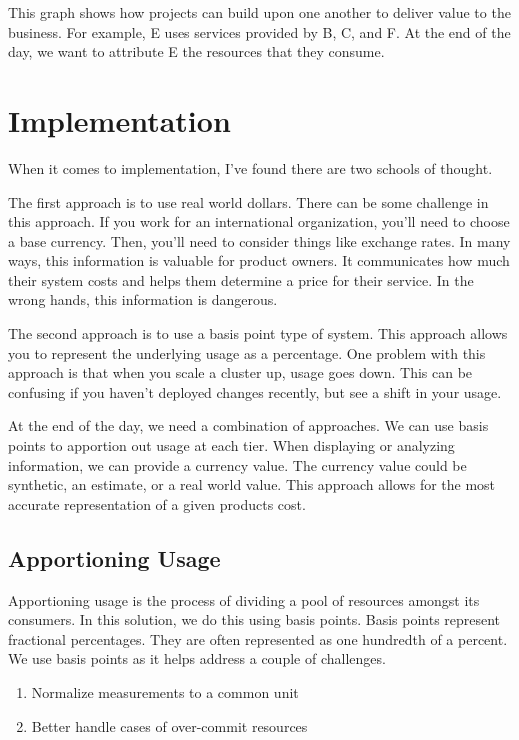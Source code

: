 \documentclass[10pt, a4paper, twocolumn]{article}
\begin{document}
    This graph shows how projects can build upon one another to deliver value to the business.
    For example, E uses services provided by B, C, and F.
    At the end of the day, we want to attribute E the resources that they consume.

\section*{Implementation}
  When it comes to implementation, I've found there are two schools of thought.

  The first approach is to use real world dollars.
  There can be some challenge in this approach.
  If you work for an international organization, you'll need to choose a base currency.
  Then, you'll need to consider things like exchange rates.
  In many ways, this information is valuable for product owners.
  It communicates how much their system costs and helps them determine a price for their service.
  In the wrong hands, this information is dangerous.

  The second approach is to use a basis point type of system.
  This approach allows you to represent the underlying usage as a percentage.
  One problem with this approach is that when you scale a cluster up, usage goes down.
  This can be confusing if you haven't deployed changes recently, but see a shift in your usage.

  At the end of the day, we need a combination of approaches.
  We can use basis points to apportion out usage at each tier.
  When displaying or analyzing information, we can provide a currency value.
  The currency value could be synthetic, an estimate, or a real world value.
  This approach allows for the most accurate representation of a given products cost.

  \subsection*{Apportioning Usage}
    Apportioning usage is the process of dividing a pool of resources amongst its consumers.
    In this solution, we do this using basis points.
    Basis points represent fractional percentages.
    They are often represented as one hundredth of a percent.
    We use basis points as it helps address a couple of challenges.

    \begin{enumerate}
      \item Normalize measurements to a common unit
      \item Better handle cases of over-commit resources
    \end{enumerate}
\end{document}
